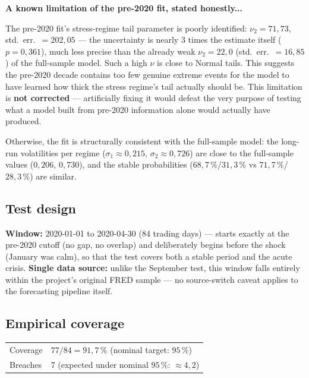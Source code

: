 \documentclass[12pt,a4paper]{article}
\begin{document}
\begin{limitbox}
	\textbf{A known limitation of the pre-2020 fit, stated
		honestly...}
	
	The pre-2020 fit's stress-regime tail parameter is
	poorly identified: $\nu_2 = 71{,}73$, std.\ err.\ $=202{,}05$
	--- the uncertainty is nearly 3 times the estimate itself
	($p=0{,}361$), much less precise than the already weak
	$\nu_2 = 22{,}0$ (std.\ err.\ $=16{,}85$) of the full-sample
	model. Such a high $\nu$ is close to Normal tails. This suggests
	the pre-2020 decade contains too few genuine extreme
	events for the model to have learned how thick the stress
	regime's tail actually should be. This limitation is
	\textbf{not corrected} --- artificially fixing it would defeat the
	very purpose of testing what a model built from
	pre-2020 information alone would actually have produced.
	
	Otherwise, the fit is structurally consistent with the
	full-sample model: the long-run volatilities per
	regime ($\sigma_1 \approx 0{,}215$, $\sigma_2 \approx 0{,}726$) are
	close to the full-sample values ($0{,}206$, $0{,}730$),
	and the stable probabilities ($68{,}7\,\%$/$31{,}3\,\%$ vs
	$71{,}7\,\%$/$28{,}3\,\%$) are similar.
\end{limitbox}

\subsection{Test design}

\textbf{Window:} 2020-01-01 to 2020-04-30 (84 trading days) ---
starts exactly at the pre-2020 cutoff (no gap, no overlap)
and deliberately begins before the shock (January was calm), so
that the test covers both a stable period and the acute
crisis.
\textbf{Single data source:} unlike the September test,
this window falls entirely within the project's original FRED
sample --- no source-switch caveat applies to the
forecasting pipeline itself. 


\subsection{Empirical coverage}

\begin{center}
	\begin{tabular}{ll}
		\toprule
		Coverage & $77/84 = 91{,}7\,\%$ (nominal target: $95\,\%$) \\
		Breaches & 7 (expected under nominal $95\,\%$: $\approx 4{,}2$) \\
		\bottomrule
	\end{tabular}	
	\end{center}
	
\end{document}
